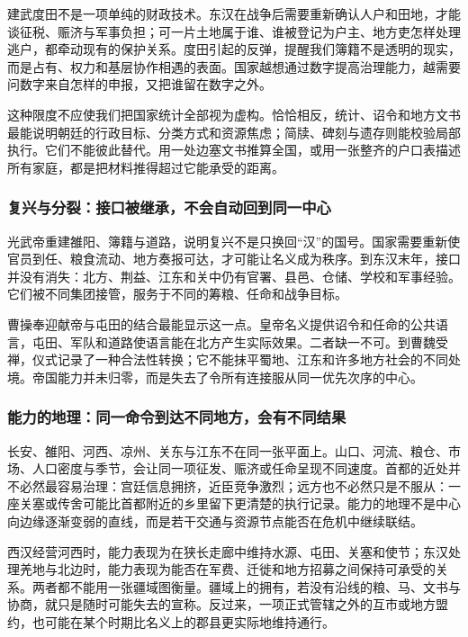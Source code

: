 建武度田不是一项单纯的财政技术。东汉在战争后需要重新确认人户和田地，才能谈征税、赈济与军事负担；可一片土地属于谁、谁被登记为户主、地方吏怎样处理逃户，都牵动现有的保护关系。度田引起的反弹，提醒我们簿籍不是透明的现实，而是占有、权力和基层协作相遇的表面。国家越想通过数字提高治理能力，越需要问数字来自怎样的申报，又把谁留在数字之外。

这种限度不应使我们把国家统计全部视为虚构。恰恰相反，统计、诏令和地方文书最能说明朝廷的行政目标、分类方式和资源焦虑；简牍、碑刻与遗存则能校验局部执行。它们不能彼此替代。用一处边塞文书推算全国，或用一张整齐的户口表描述所有家庭，都是把材料推得超过它能承受的距离。

\subsubsection{复兴与分裂：接口被继承，不会自动回到同一中心}

光武帝重建雒阳、簿籍与道路，说明复兴不是只换回“汉”的国号。国家需要重新使官员到任、粮食流动、地方奏报可达，才可能让名义成为秩序。到东汉末年，接口并没有消失：北方、荆益、江东和关中仍有官署、县邑、仓储、学校和军事经验。它们被不同集团接管，服务于不同的筹粮、任命和战争目标。

曹操奉迎献帝与屯田的结合最能显示这一点。皇帝名义提供诏令和任命的公共语言，屯田、军队和道路使语言能在北方产生实际效果。二者缺一不可。到曹魏受禅，仪式记录了一种合法性转换；它不能抹平蜀地、江东和许多地方社会的不同处境。帝国能力并未归零，而是失去了令所有连接服从同一优先次序的中心。

\subsubsection{能力的地理：同一命令到达不同地方，会有不同结果}

长安、雒阳、河西、凉州、关东与江东不在同一张平面上。山口、河流、粮仓、市场、人口密度与季节，会让同一项征发、赈济或任命呈现不同速度。首都的近处并不必然最容易治理：宫廷信息拥挤，近臣竞争激烈；远方也不必然只是不服从：一座关塞或传舍可能比首都附近的乡里留下更清楚的执行记录。能力的地理不是中心向边缘逐渐变弱的直线，而是若干交通与资源节点能否在危机中继续联结。

西汉经营河西时，能力表现为在狭长走廊中维持水源、屯田、关塞和使节；东汉处理羌地与北边时，能力表现为能否在军费、迁徙和地方招募之间保持可承受的关系。两者都不能用一张疆域图衡量。疆域上的拥有，若没有沿线的粮、马、文书与协商，就只是随时可能失去的宣称。反过来，一项正式管辖之外的互市或地方盟约，也可能在某个时期比名义上的郡县更实际地维持通行。

